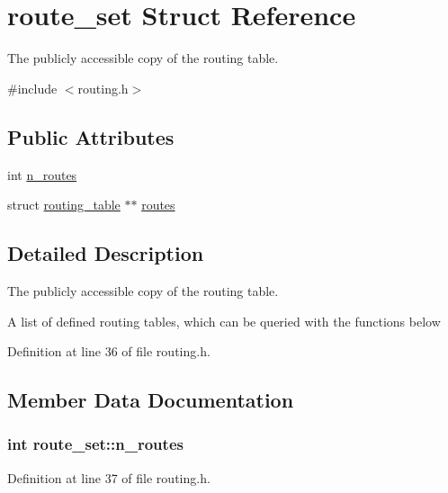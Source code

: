 \hypertarget{structroute__set}{\section{route\-\_\-set Struct Reference}
\label{structroute__set}
}


The publicly accessible copy of the routing table.  




{\ttfamily \#include $<$routing.\-h$>$}

\subsection*{Public Attributes}
\begin{DoxyCompactItemize}
\item 
int \hyperlink{structroute__set_ad4302290a2b2aaf50f105aae58926794}{n\-\_\-routes}
\item 
struct \hyperlink{structrouting__table}{routing\-\_\-table} $\ast$$\ast$ \hyperlink{structroute__set_a423016a014c4eb12726597161ec0b6f9}{routes}
\end{DoxyCompactItemize}


\subsection{Detailed Description}
The publicly accessible copy of the routing table. 

A list of defined routing tables, which can be queried with the functions below 

Definition at line 36 of file routing.\-h.



\subsection{Member Data Documentation}
\hypertarget{structroute__set_ad4302290a2b2aaf50f105aae58926794}{
\subsubsection[{n\-\_\-routes}]{\setlength{\rightskip}{0pt plus 5cm}int route\-\_\-set\-::n\-\_\-routes}}\label{structroute__set_ad4302290a2b2aaf50f105aae58926794}


Definition at line 37 of file routing.\-h.

